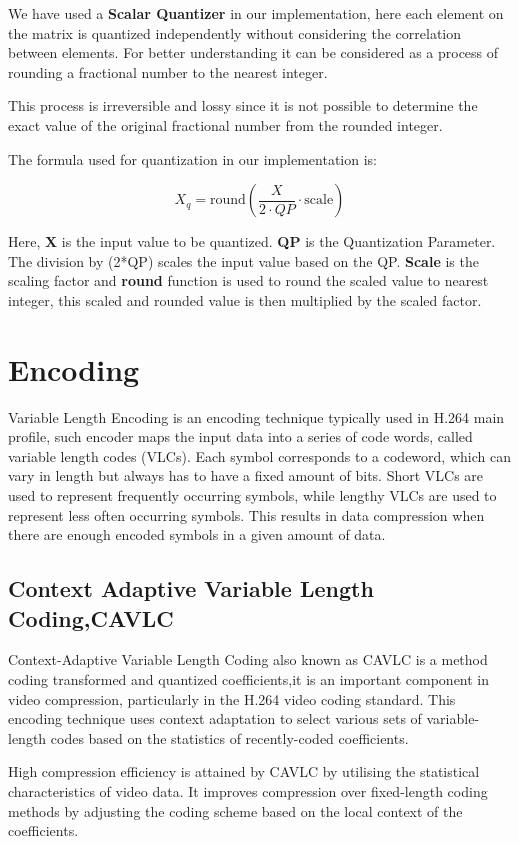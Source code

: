 We have used a \textbf{Scalar Quantizer} in our implementation, here each element on the matrix is quantized independently without considering the correlation between elements. For better understanding it can be considered as a process of rounding a fractional number to the nearest integer.

This process is irreversible and lossy since it is not possible to determine the exact value of the original fractional number from the rounded integer.

The formula used for quantization in our implementation is:

\[
X_q = \text{round}\left(\frac{X}{{2 \cdot QP}} \cdot \text{scale}\right)
\]

Here, \textbf{X} is the input value to be quantized. \textbf{QP} is the Quantization Parameter. The division by (2*QP) scales the input value based on the QP. \textbf{Scale} is the scaling factor and \textbf{round} function is used to round the scaled value to nearest integer, this scaled and rounded value is then multiplied by the scaled factor.

\section{Encoding}
Variable Length Encoding is an encoding technique typically used in H.264 main profile, such encoder maps the input data into a series of code words, called variable length codes (VLCs). Each symbol corresponds to a codeword, which can vary in length but always has to have a fixed amount of bits. Short VLCs are used to represent frequently occurring symbols, while lengthy VLCs are used to represent less often occurring symbols. This results in data compression when there are enough encoded symbols in a given amount of data.

\subsection{Context Adaptive Variable Length Coding,CAVLC}
Context-Adaptive Variable Length Coding also known as CAVLC is a method coding transformed and quantized coefficients,it is an important component in video compression, particularly in the H.264 video coding standard. This encoding technique uses context adaptation to select various sets of variable-length codes based on the statistics of recently-coded coefficients.

High compression efficiency is attained by CAVLC by utilising the statistical characteristics of video data. It improves compression over fixed-length coding methods by adjusting the coding scheme based on the local context of the coefficients.

